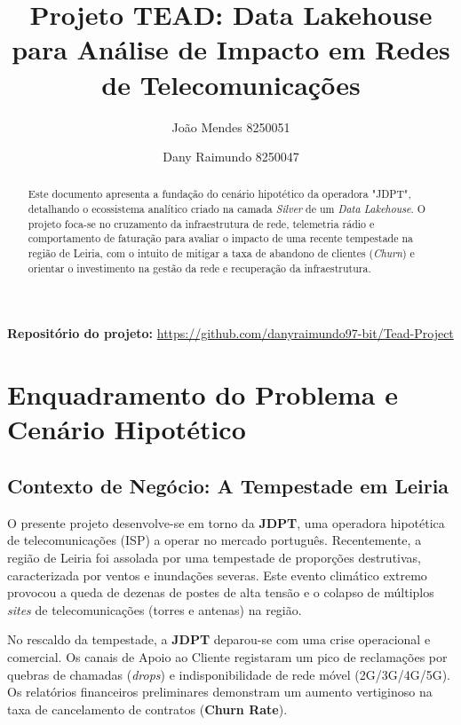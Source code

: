 \documentclass[runningheads]{llncs}
\newcommand{\teadrepo}{https://github.com/danyraimundo97-bit/Tead-Project}
\begin{document}
\title{Projeto TEAD: Data Lakehouse para Análise de Impacto em Redes de Telecomunicações}

\author{João Mendes 8250051 \and Dany Raimundo 8250047}


\maketitle

\noindent\textbf{Repositório do projeto:} \url{\teadrepo}

\begin{abstract}
Este documento apresenta a fundação do cenário hipotético da operadora "JDPT", detalhando o ecossistema analítico criado na camada \textit{Silver} de um \textit{Data Lakehouse}. O projeto foca-se no cruzamento da infraestrutura de rede, telemetria rádio e comportamento de faturação para avaliar o impacto de uma recente tempestade na região de Leiria, com o intuito de mitigar a taxa de abandono de clientes (\textit{Churn}) e orientar o investimento na gestão da rede e recuperação da infraestrutura.
\end{abstract}




\section{Enquadramento do Problema e Cenário Hipotético}


\subsection{Contexto de Negócio: A Tempestade em Leiria}
O presente projeto desenvolve-se em torno da \textbf{JDPT}, uma operadora hipotética de telecomunicações (ISP) a operar no mercado português. Recentemente, a região de Leiria foi assolada por uma tempestade de proporções destrutivas, caracterizada por ventos e inundações severas. Este evento climático extremo provocou a queda de dezenas de postes de alta tensão e o colapso de múltiplos \textit{sites} de telecomunicações (torres e antenas) na região.

No rescaldo da tempestade, a \textbf{JDPT} deparou-se com uma crise operacional e comercial. Os canais de Apoio ao Cliente registaram um pico de reclamações por quebras de chamadas (\textit{drops}) e indisponibilidade de rede móvel (2G/3G/4G/5G). Os relatórios financeiros preliminares demonstram um aumento vertiginoso na taxa de cancelamento de contratos (\textbf{Churn Rate}).
\end{document}

